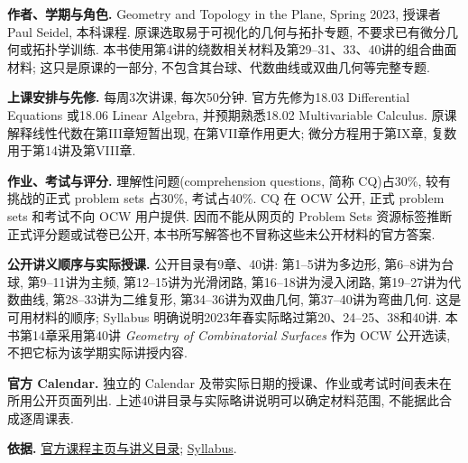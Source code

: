 \par\addvspace{9pt}
\par\nobreak\vspace{4pt}

\textbf{作者、学期与角色.} Geometry and Topology in the Plane, Spring 2023, 授课者 Paul Seidel, 本科课程. 原课选取易于可视化的几何与拓扑专题, 不要求已有微分几何或拓扑学训练. 本书使用第4讲的绕数相关材料及第29--31、33、40讲的组合曲面材料; 这只是原课的一部分, 不包含其台球、代数曲线或双曲几何等完整专题.

\textbf{上课安排与先修.} 每周3次讲课, 每次50分钟. 官方先修为18.03 Differential Equations 或18.06 Linear Algebra, 并预期熟悉18.02 Multivariable Calculus. 原课解释线性代数在第III章短暂出现, 在第VII章作用更大; 微分方程用于第IX章, 复数用于第14讲及第VIII章.

\textbf{作业、考试与评分.} 理解性问题(comprehension questions, 简称 CQ)占30\%, 较有挑战的正式 problem sets 占30\%, 考试占40\%. CQ 在 OCW 公开, 正式 problem sets 和考试不向 OCW 用户提供. 因而不能从网页的 Problem Sets 资源标签推断正式评分题或试卷已公开, 本书所写解答也不冒称这些未公开材料的官方答案.

\textbf{公开讲义顺序与实际授课.} 公开目录有9章、40讲: 第1--5讲为多边形, 第6--8讲为台球, 第9--11讲为主频, 第12--15讲为光滑闭路, 第16--18讲为浸入闭路, 第19--27讲为代数曲线, 第28--33讲为二维复形, 第34--36讲为双曲几何, 第37--40讲为弯曲几何. 这是可用材料的顺序; Syllabus 明确说明2023年春实际略过第20、24--25、38和40讲. 本书第14章采用第40讲 \emph{Geometry of Combinatorial Surfaces} 作为 OCW 公开选读, 不把它标为该学期实际讲授内容.

\textbf{官方 Calendar.} 独立的 Calendar 及带实际日期的授课、作业或考试时间表未在所用公开页面列出. 上述40讲目录与实际略讲说明可以确定材料范围, 不能据此合成逐周课表.

\textbf{依据.} \href{https://ocw.mit.edu/courses/18-900-geometry-and-topology-in-the-plane-spring-2023/}{官方课程主页与讲义目录}; \href{https://ocw.mit.edu/courses/18-900-geometry-and-topology-in-the-plane-spring-2023/pages/syllabus/}{Syllabus}.

\par\addvspace{9pt}
\par\nobreak\vspace{4pt}

